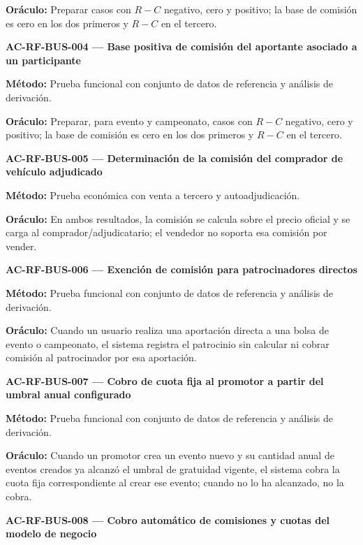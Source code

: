 \documentclass[10pt,letterpaper]{article}
\begin{document}
\textbf{Oráculo:} Preparar casos con $R-C$ negativo, cero y positivo; la base de comisión es cero en los dos primeros y $R-C$ en el tercero.\par\vspace{0.45em}
\noindent\textbf{AC-RF-BUS-004 --- Base positiva de comisión del aportante asociado a un participante}\par
\textbf{Método:} Prueba funcional con conjunto de datos de referencia y análisis de derivación.\par
\textbf{Oráculo:} Preparar, para evento y campeonato, casos con $R-C$ negativo, cero y positivo; la base de comisión es cero en los dos primeros y $R-C$ en el tercero.\par\vspace{0.45em}
\noindent\textbf{AC-RF-BUS-005 --- Determinación de la comisión del comprador de vehículo adjudicado}\par
\textbf{Método:} Prueba económica con venta a tercero y autoadjudicación.\par
\textbf{Oráculo:} En ambos resultados, la comisión se calcula sobre el precio oficial y se carga al comprador/adjudicatario; el vendedor no soporta esa comisión por vender.\par\vspace{0.45em}
\noindent\textbf{AC-RF-BUS-006 --- Exención de comisión para patrocinadores directos}\par
\textbf{Método:} Prueba funcional con conjunto de datos de referencia y análisis de derivación.\par
\textbf{Oráculo:} Cuando un usuario realiza una aportación directa a una bolsa de evento o campeonato, el sistema registra el patrocinio sin calcular ni cobrar comisión al patrocinador por esa aportación.\par\vspace{0.45em}
\noindent\textbf{AC-RF-BUS-007 --- Cobro de cuota fija al promotor a partir del umbral anual configurado}\par
\textbf{Método:} Prueba funcional con conjunto de datos de referencia y análisis de derivación.\par
\textbf{Oráculo:} Cuando un promotor crea un evento nuevo y su cantidad anual de eventos creados ya alcanzó el umbral de gratuidad vigente, el sistema cobra la cuota fija correspondiente al crear ese evento; cuando no lo ha alcanzado, no la cobra.\par\vspace{0.45em}
\noindent\textbf{AC-RF-BUS-008 --- Cobro automático de comisiones y cuotas del modelo de negocio}\par
\end{document}
